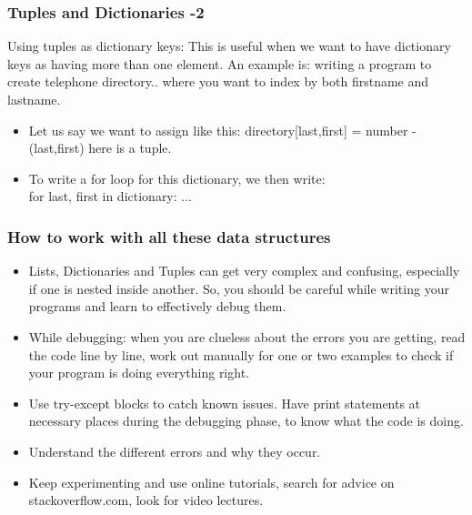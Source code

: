 \documentclass{beamer}
\begin{document}
\begin{frame}[fragile]
\frametitle{Tuples and Dictionaries -2}
Using tuples as dictionary keys: This is useful when we want to have dictionary keys as having more than one element. An example is: writing a program to create telephone directory.. where you want to index by both firstname and lastname. 
\begin{itemize}
\item Let us say we want to assign like this: directory[last,first] = number - (last,first) here is a tuple.
\item To write a for loop for this dictionary, we then write: \\ for last, first in dictionary: ...
\end{itemize}
\end{frame}

\begin{frame} %
\frametitle{How to work with all these data structures}
\begin{itemize}
\item Lists, Dictionaries and Tuples can get very complex and confusing, especially if one is nested inside another. So, you should be careful while writing your programs and learn to effectively debug them. \pause
\item While debugging: when you are clueless about the errors you are getting, read the code line by line, work out manually for one or two examples to check if your program is doing everything right. \pause
\item Use try-except blocks to catch known issues. Have print statements at necessary places during the debugging phase, to know what the code is doing.\pause
\item Understand the different errors and why they occur. \pause
\item Keep experimenting and use online tutorials, search for advice on stackoverflow.com, look for video lectures.
\end{itemize}
\end{frame}
\end{document}
